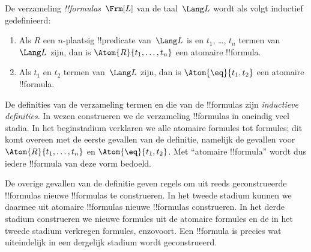 \documentclass[openany]{memoir}
\begin{document}
\begin{defn}[Formules]
De verzameling \emph{!!{formula}s}~$\Frm[L]$ van de taal~$\Lang L$
wordt als volgt inductief gedefinieerd:
\begin{enumerate}


\item Als $R$ een $n$-plaatsig !!{predicate} van~$\Lang L$ is en $t_1$, \dots,
  $t_n$ termen van~$\Lang L$ zijn, dan is $\Atom{R}{t_1,\ldots, t_n}$ een
  atomaire !!{formula}.

\item Als $t_1$ en $t_2$ termen van~$\Lang L$ zijn, dan is $\Atom{\eq}{t_1, t_2}$
  een atomaire !!{formula}.








\end{enumerate}
\end{defn}

\begin{explain}
De definities van de verzameling termen en die van de !!{formula}s zijn
\emph{inductieve definities}. In wezen construeren we de verzameling
!!{formula}s in oneindig veel stadia. In het beginstadium verklaren we
alle atomaire formules tot formules; dit komt overeen met de eerste
gevallen van de definitie, namelijk de gevallen voor
%
%
$\Atom{R}{t_1,\dots,t_n}$ en $\Atom{\eq}{t_1,t_2}$. Met ``atomaire
!!{formula}'' wordt dus iedere !!{formula} van deze vorm bedoeld.

De overige gevallen van de definitie geven regels om uit reeds
geconstrueerde !!{formula}s nieuwe !!{formula}s te construeren. In het
tweede stadium kunnen we daarmee uit atomaire !!{formula}s nieuwe
!!{formula}s construeren. In het derde stadium construeren we nieuwe
formules uit de atomaire formules en de in het tweede stadium verkregen
formules, enzovoort. Een !!{formula} is precies wat uiteindelijk in een
dergelijk stadium wordt geconstrueerd.
\end{explain}
\end{document}
